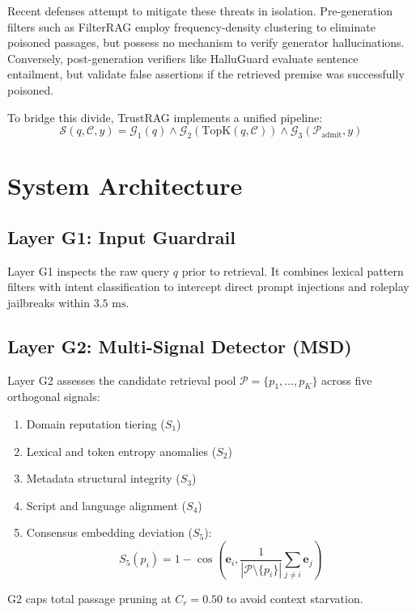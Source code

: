 \documentclass[11pt,a4paper]{article}
\begin{document}
Recent defenses attempt to mitigate these threats in isolation. Pre-generation filters such as FilterRAG \cite{filterrag2025} employ frequency-density clustering to eliminate poisoned passages, but possess no mechanism to verify generator hallucinations. Conversely, post-generation verifiers like HalluGuard evaluate sentence entailment, but validate false assertions if the retrieved premise was successfully poisoned.

To bridge this divide, TrustRAG implements a unified pipeline:
\begin{equation}
\mathcal{S}(q, \mathcal{C}, y) = \mathcal{G}_1(q) \land \mathcal{G}_2(\text{TopK}(q, \mathcal{C})) \land \mathcal{G}_3(\mathcal{P}_{\text{admit}}, y)
\end{equation}

\section{System Architecture}
\subsection{Layer G1: Input Guardrail}
Layer G1 inspects the raw query $q$ prior to retrieval. It combines lexical pattern filters with intent classification to intercept direct prompt injections and roleplay jailbreaks within $3.5\text{ ms}$.

\subsection{Layer G2: Multi-Signal Detector (MSD)}
Layer G2 assesses the candidate retrieval pool $\mathcal{P} = \{p_1, \dots, p_K\}$ across five orthogonal signals:
\begin{enumerate}
    \item Domain reputation tiering ($S_1$)
    \item Lexical and token entropy anomalies ($S_2$)
    \item Metadata structural integrity ($S_3$)
    \item Script and language alignment ($S_4$)
    \item Consensus embedding deviation ($S_5$):
    \begin{equation}
    S_5(p_i) = 1 - \cos\left(\mathbf{e}_i, \frac{1}{|\mathcal{P} \setminus \{p_i\}|}\sum_{j \ne i} \mathbf{e}_j\right)
    \end{equation}
\end{enumerate}
G2 caps total passage pruning at $C_r = 0.50$ to avoid context starvation.
\end{document}
